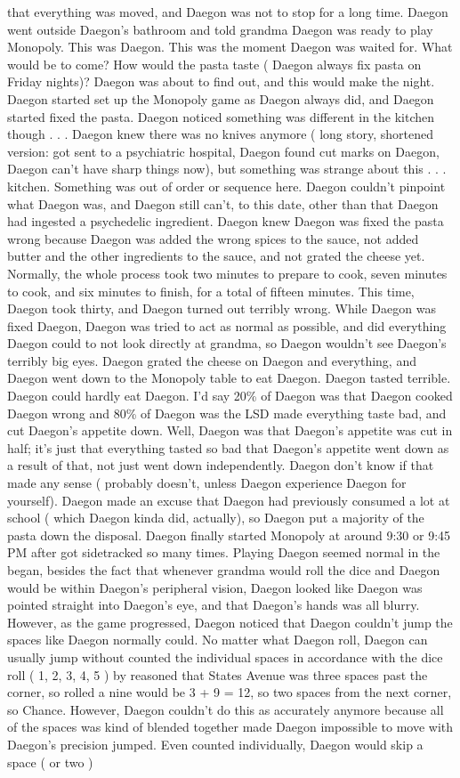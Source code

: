 \documentclass[12pt]{book}
\begin{document}
that everything was moved, and Daegon was not to stop for a long time. Daegon went outside Daegon's bathroom and told grandma Daegon was ready to play Monopoly. This was Daegon. This was the moment Daegon was waited for. What would be to come? How would the pasta taste ( Daegon always fix pasta on Friday nights)? Daegon was about to find out, and this would make the night. Daegon started set up the Monopoly game as Daegon always did, and Daegon started fixed the pasta. Daegon noticed something was different in the kitchen though . . .  Daegon knew there was no knives anymore ( long story, shortened version: got sent to a psychiatric hospital, Daegon found cut marks on Daegon, Daegon can't have sharp things now), but something was strange about this . . .  kitchen. Something was out of order or sequence here. Daegon couldn't pinpoint what Daegon was, and Daegon still can't, to this date, other than that Daegon had ingested a psychedelic ingredient. Daegon knew Daegon was fixed the pasta wrong because Daegon was added the wrong spices to the sauce, not added butter and the other ingredients to the sauce, and not grated the cheese yet. Normally, the whole process took two minutes to prepare to cook, seven minutes to cook, and six minutes to finish, for a total of fifteen minutes. This time, Daegon took thirty, and Daegon turned out terribly wrong. While Daegon was fixed Daegon, Daegon was tried to act as normal as possible, and did everything Daegon could to not look directly at grandma, so Daegon wouldn't see Daegon's terribly big eyes. Daegon grated the cheese on Daegon and everything, and Daegon went down to the Monopoly table to eat Daegon. Daegon tasted terrible. Daegon could hardly eat Daegon. I'd say 20\% of Daegon was that Daegon cooked Daegon wrong and 80\% of Daegon was the LSD made everything taste bad, and cut Daegon's appetite down. Well, Daegon was that Daegon's appetite was cut in half; it's just that everything tasted so bad that Daegon's appetite went down as a result of that, not just went down independently. Daegon don't know if that made any sense ( probably doesn't, unless Daegon experience Daegon for yourself). Daegon made an excuse that Daegon had previously consumed a lot at school ( which Daegon kinda did, actually), so Daegon put a majority of the pasta down the disposal. Daegon finally started Monopoly at around 9:30 or 9:45 PM after got sidetracked so many times. Playing Daegon seemed normal in the began, besides the fact that whenever grandma would roll the dice and Daegon would be within Daegon's peripheral vision, Daegon looked like Daegon was pointed straight into Daegon's eye, and that Daegon's hands was all blurry. However, as the game progressed, Daegon noticed that Daegon couldn't jump the spaces like Daegon normally could. No matter what Daegon roll, Daegon can usually jump without counted the individual spaces in accordance with the dice roll ( 1, 2, 3, 4, 5 ) by reasoned that States Avenue was three spaces past the corner, so rolled a nine would be 3 + 9 = 12, so two spaces from the next corner, so Chance. However, Daegon couldn't do this as accurately anymore because all of the spaces was kind of blended together made Daegon impossible to move with Daegon's precision jumped. Even counted individually, Daegon would skip a space ( or two ) 
\end{document}
